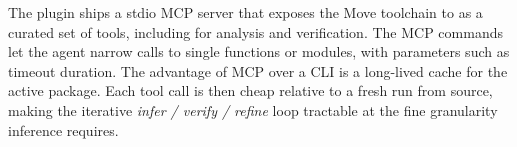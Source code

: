 The plugin ships a stdio MCP server that exposes the Move toolchain to \CC as a curated set of tools, including \MVP for \WP analysis and verification.
The MCP commands let the agent narrow calls to single functions or modules, with parameters such as timeout duration.
The advantage of MCP over a CLI is a long-lived cache for the active package.
Each tool call is then cheap relative to a fresh run from source, making the iterative \emph{infer / verify / refine} loop tractable at the fine granularity inference requires.

